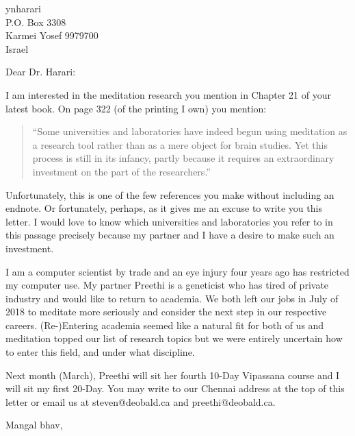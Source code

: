 \documentclass{letter}
\begin{document}
\begin{letter}{ynharari \\ P.O. Box 3308 \\ Karmei Yosef 9979700
\\ Israel}

\opening{Dear Dr. Harari:}

I am interested in the meditation research you mention in Chapter 21 of
your latest book. On page 322 (of the printing I own) you mention:

\begin{quote}
``Some universities and laboratories have indeed begun using meditation as a research
tool rather than as a mere object for brain studies. Yet this process is still in its
infancy, partly because it requires an extraordinary investment on the part of the
researchers.''
\end{quote}

Unfortunately, this is one of the few references you make without including an
endnote. Or fortunately, perhaps, as it gives me an excuse to write you this
letter. I would love to know which universities and laboratories you refer to in this
passage precisely because my partner and I have a desire to make such an investment.

I am a computer scientist by trade and
an eye injury four years ago has restricted my computer use. My partner Preethi is
a geneticist who has tired of private industry and would like to return to
academia. We both left our jobs in July of 2018 to meditate more seriously and
consider the next step in our respective careers. (Re-)Entering academia seemed like
a natural fit for both of us and meditation topped our list of research topics but we
were entirely uncertain how to enter this field, and under what discipline.

Next month (March), Preethi will sit her fourth 10-Day Vipassana course and I will
sit my first 20-Day. You may write to our Chennai address at the top of this letter
or email us at steven@deobald.ca and preethi@deobald.ca.

\closing{Mangal bhav,}

\end{letter}
\end{document}
